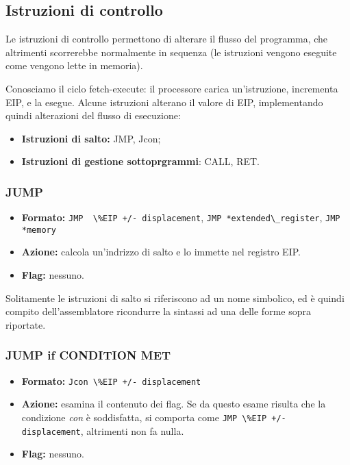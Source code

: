 \documentclass[a4paper,11pt]{article}
\begin{document}
\subsection{Istruzioni di controllo}
Le istruzioni di controllo permettono di alterare il flusso del programma, che altrimenti scorrerebbe normalmente in sequenza (le istruzioni vengono eseguite come vengono lette in memoria).

Conosciamo il ciclo fetch-execute: il processore carica un'istruzione, incrementa EIP, e la esegue.
Alcune istruzioni alterano il valore di EIP, implementando quindi alterazioni del flusso di esecuzione:
\begin{itemize}
	\item \textbf{Istruzioni di salto:} JMP, Jcon;
	\item \textbf{Istruzioni di gestione sottoprgrammi}: CALL, RET.
\end{itemize}

\subsubsection{JUMP}
\begin{itemize}
	\item \textbf{Formato:} \lstinline|JMP  \%EIP +/- displacement|, \lstinline|JMP *extended\_register|, \lstinline|JMP *memory|
	\item \textbf{Azione:} calcola un'indrizzo di salto e lo immette nel registro EIP. 
	\item \textbf{Flag:} nessuno. 
\end{itemize}

Solitamente le istruzioni di salto si riferiscono ad un nome simbolico, ed è quindi compito dell'assemblatore ricondurre la sintassi ad una delle forme sopra riportate.

\subsubsection{JUMP if CONDITION MET}
\begin{itemize}
	\item \textbf{Formato:} \lstinline|Jcon \%EIP +/- displacement|
	\item \textbf{Azione:} esamina il contenuto dei flag.
		Se da questo esame risulta che la condizione \textit{con} è soddisfatta, si comporta come \lstinline|JMP \%EIP +/- displacement|, altrimenti non fa nulla.
	\item \textbf{Flag:} nessuno. 
\end{itemize}
\end{document}
